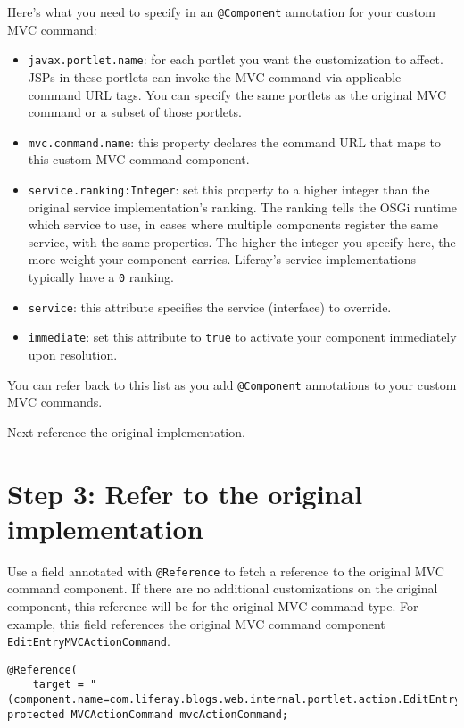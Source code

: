 Here's what you need to specify in an \texttt{@Component} annotation for
your custom MVC command:

\begin{itemize}
\item
  \texttt{javax.portlet.name}: for each portlet you want the
  customization to affect. JSPs in these portlets can invoke the MVC
  command via applicable command URL tags. You can specify the same
  portlets as the original MVC command or a subset of those portlets.
\item
  \texttt{mvc.command.name}: this property declares the command URL that
  maps to this custom MVC command component.
\item
  \texttt{service.ranking:Integer}: set this property to a higher
  integer than the original service implementation's ranking. The
  ranking tells the OSGi runtime which service to use, in cases where
  multiple components register the same service, with the same
  properties. The higher the integer you specify here, the more weight
  your component carries. Liferay's service implementations typically
  have a \texttt{0} ranking.
\item
  \texttt{service}: this attribute specifies the service (interface) to
  override.
\item
  \texttt{immediate}: set this attribute to \texttt{true} to activate
  your component immediately upon resolution.
\end{itemize}

You can refer back to this list as you add \texttt{@Component}
annotations to your custom MVC commands.

Next reference the original implementation.

\section{Step 3: Refer to the original
implementation}\label{step-3-refer-to-the-original-implementation}

Use a field annotated with \texttt{@Reference} to fetch a reference to
the original MVC command component. If there are no additional
customizations on the original component, this reference will be for the
original MVC command type. For example, this field references the
original MVC command component \texttt{EditEntryMVCActionCommand}.

\begin{verbatim}
@Reference(
    target = "(component.name=com.liferay.blogs.web.internal.portlet.action.EditEntryMVCActionCommand)")
protected MVCActionCommand mvcActionCommand;
\end{verbatim}

